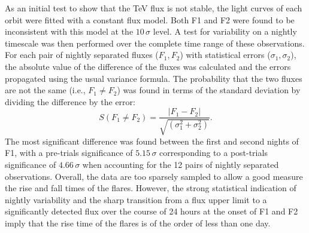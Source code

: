 \documentclass[preprint2]{aastex}
\begin{document}
As an initial test to show that the TeV flux is not stable, the light curves of each orbit were fitted with a constant flux model. Both F1 and F2 were found to be inconsistent with this model at the $10\,\sigma$ level. A test for variability on a nightly timescale was then performed over the complete time range of these observations. For each pair of nightly separated fluxes ($F_1, F_2$) with statistical errors ($\sigma_1,\sigma_2$), the absolute value of the difference of the fluxes was calculated and the errors propagated using the usual variance formula. The probability that the two fluxes are not the same (i.e., $F_1 \neq F_2$) was found in terms of the standard deviation by dividing the difference by the error:
\begin{equation}
S(F_1 \neq F_2) = \frac{|F_1 - F_2|}{\sqrt{(\sigma_1^2 + \sigma_2^2)}}.
\end{equation}
The most significant difference was found between the first and second nights of F1, with a pre-trials significance of $5.15\,\sigma$ corresponding to a post-trials significance of $4.66\,\sigma$ when accounting for the 12 pairs of nightly separated observations.
Overall, the data are too sparsely sampled to allow a good measure the rise and fall times of the flares. However, the strong statistical indication of nightly variability and the sharp transition from a flux upper limit to a significantly detected flux over the course of 24 hours at the onset of F1 and F2 imply that the rise time of the flares is of the order of less than one day.
\end{document}

